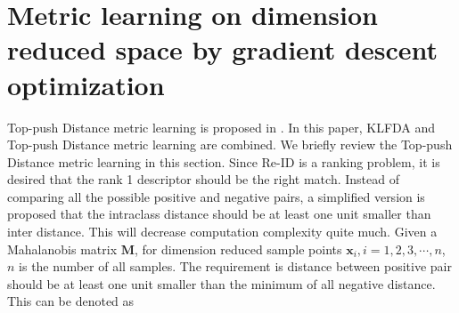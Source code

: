 \documentclass[10pt,twocolumn,letterpaper]{article}
\begin{document}
\section{Metric learning on dimension reduced space by gradient descent optimization}
Top-push Distance metric learning is proposed in \cite{TDL}. In this paper, KLFDA and Top-push Distance metric learning are combined. We briefly review the Top-push Distance metric learning in this section. Since Re-ID is a ranking problem, it is desired that the rank 1 descriptor should be the right match. Instead of comparing all the possible positive and negative pairs, a simplified version is proposed that the intraclass distance should be at least one unit smaller than inter distance. This will decrease computation complexity quite much. Given a Mahalanobis matrix $\bm{M}$, for dimension reduced sample points $\bm{x}_i, i = 1,2,3,\cdots,n$, $n$ is the number of all samples. The requirement is distance between positive pair should be at least one unit smaller than the minimum of all negative distance. This can be denoted as 
\end{document}
